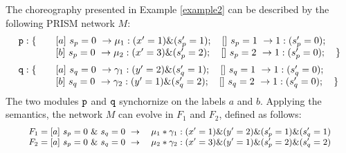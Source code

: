 \begin{example}
   The choreography presented in Example
  \ref{example2} can be described by the following PRISM network $M$:
\begin{displaymath}
  \begin{array}{llll}
    \mathtt{p}: \{ & \quad [a]\ s_p=0\ \rightarrow \mu_1:(x'=1)\&(s_p'=1); \quad []\ s_p=1\ \rightarrow 1:(s_p'=0);\\
                 & \quad [b]\ s_p=0\ \rightarrow \mu_2:(x'=3)\&(s_p'=2);\quad []\ s_p=2\ \rightarrow 1:(s_p'=0);\quad \}\\[2mm]
    \mathtt{q}: \{ & \quad [a]\ s_q=0\ \rightarrow \gamma_1:(y'=2)\&(s_q'=1); \quad []\ s_q=1\ \rightarrow 1:(s_q'=0);\\
                 & \quad [b]\ s_q=0\ \rightarrow \gamma_2:(y'=1)\&(s_q'=2); \quad []\ s_q=2\ \rightarrow 1:(s_q'=0);\quad \}\\
  \end{array}
\end{displaymath}
The two modules $\mathtt{p}$ and $\mathtt{q}$ synchornize on the labels $a$ and $b$. 
Applying the semantics, the network $M$ can evolve in $F_1$ and $F_2$, defined as follows:
\begin{displaymath}\small
  \begin{array}{rlll}
    F_1=\commandBase {a}{s_p=0\ \&\ s_q=0} {\quad} \mu_1*\gamma_1 : (x'=1) \& (y'=2) \& (s_p'=1) \& (s_q'=1) \\
    F_2=\commandBase {a}{s_p=0\ \&\ s_q=0} {\quad} \mu_2*\gamma_2 : (x'=3) \& (y'=1) \& (s_p'=2) \& (s_q'=2)\\

  \end{array}
\end{displaymath} 

\end{example}

